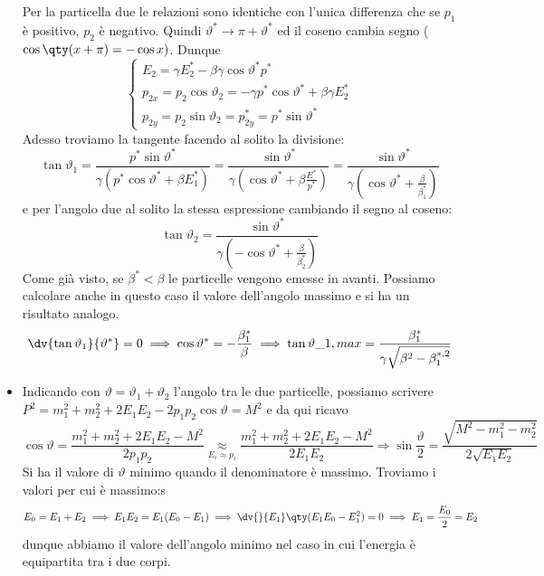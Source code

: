 \begin{itemize}
        Per la particella due le relazioni sono identiche con l'unica differenza che se $p_1$ è positivo, $p_2$ è negativo. Quindi $\vartheta^*\to\pi+\vartheta^*$ ed il coseno cambia segno ($\cos\qty(x+\pi)=-\cos x)$. Dunque
        \begin{equation*}
            \begin{cases}
                E_2=\gamma E_2^*-\beta\gamma\cos\vartheta^* p^*\\
                p_{2x}=p_2\cos\vartheta_2=-\gamma p^*\cos\vartheta^*+\beta\gamma E^*_2\\
                p_{2y}=p_2\sin\vartheta_2=p_{2y}^* = p^*\sin\vartheta^*
            \end{cases}
        \end{equation*}
        Adesso troviamo la tangente facendo al solito la divisione:
        \begin{equation*}
            \tan\vartheta_1=\frac{p^*\sin\vartheta^*}{\gamma (p^*\cos\vartheta^*+\beta E_1^*)}=\frac{\sin\vartheta^*}{\gamma(\cos\vartheta^*+\beta\frac{E^*}{p^*})}=\frac{\sin\vartheta^*}{\gamma(\cos\vartheta^*+\frac{\beta}{\beta_1^*})}
        \end{equation*}
        e per l'angolo due al solito la stessa espressione cambiando il segno al coseno:
        \begin{equation*}
            \tan\vartheta_2=\frac{\sin\vartheta^*}{\gamma(-\cos\vartheta^*+\frac{\beta}{\beta_2^*})}
        \end{equation*}
        Come già visto, se $\beta^*<\beta$ le particelle vengono emesse in avanti. Possiamo calcolare anche in questo caso il valore dell'angolo massimo e si ha un risultato analogo.
        \begin{equation*}
            \dv{\tan\vartheta_1}{\vartheta^*}=0\implies \cos\vartheta^*=-\frac{\beta_1^*}{\beta}\implies \tan\vartheta\_{1,max}=\frac{\beta_1^*}{\gamma\sqrt{\beta^2-\beta_1^{*,2}}}
        \end{equation*}
        \item Indicando con $\vartheta=\vartheta_1+\vartheta_2$ l'angolo tra le due particelle, possiamo scrivere $P^2=m_1^2+m_2^2+2E_1E_2-2p_1p_2\cos\vartheta=M^2$ e da qui ricavo 
        \begin{equation*}
            \cos\vartheta=\frac{m_1^2+m_2^2+2E_1E_2-M^2}{2p_1p_2}\underset{E_i\approx p_i}{\approx}\frac{m_1^2+m_2^2+2E_1E_2-M^2}{2E_1E_2}\Rightarrow \sin\frac\vartheta2=\frac{\sqrt{M^2-m_1^2-m_2^2}}{2\sqrt{E_1E_2}}
        \end{equation*}
        Si ha il valore di $\vartheta$ minimo quando il denominatore è massimo. Troviamo i valori per cui è massimo:s
        \begin{equation*}
            E_0=E_1+E_2\implies E_1E_2=E_1(E_0-E_1)\implies \dv{}{E_1}\qty(E_1E_0-E_1^2)=0\implies E_1=\frac{E_0}2=E_2
        \end{equation*}
        dunque abbiamo il valore dell'angolo minimo nel caso in cui l'energia è equipartita tra i due corpi.
\end{itemize}
